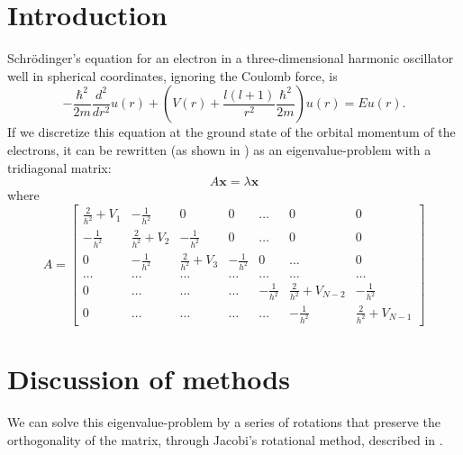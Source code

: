 \documentclass[a4paper]{article}
\begin{document}
\section{Introduction}\label{sec:intro}
Schrödinger's equation for an electron in a three-dimensional harmonic oscillator well in spherical coordinates, ignoring the Coulomb force, is
\begin{equation}
  -\frac{\hbar^2}{2 m} \frac{d^2}{dr^2} u(r)
       + \left ( V(r) + \frac{l (l + 1)}{r^2}\frac{\hbar^2}{2 m}
                                    \right ) u(r)  = E u(r) .
\end{equation}
If we discretize this equation at the ground state of the orbital momentum of the electrons, it can be rewritten (as shown in \cite{fys3150_project2}) as an eigenvalue-problem with a tridiagonal matrix:
\begin{equation*}
A\textbf{x} = \lambda \textbf{x}
\end{equation*}
where
\begin{equation}
A = \begin{bmatrix} \frac{2}{h^2}+V_1 & -\frac{1}{h^2} & 0   & 0    & \dots  &0     & 0 \\
                                -\frac{1}{h^2} & \frac{2}{h^2}+V_2 & -\frac{1}{h^2} & 0    & \dots  &0     &0 \\
                                0   & -\frac{1}{h^2} & \frac{2}{h^2}+V_3 & -\frac{1}{h^2}  &0       &\dots & 0\\
                                \dots  & \dots & \dots & \dots  &\dots      &\dots & \dots\\
                                0   & \dots & \dots & \dots  &-\frac{1}{h^2}  &\frac{2}{h^2}+V_{N-2} & -\frac{1}{h^2}\\
                                0   & \dots & \dots & \dots  &\dots       &-\frac{1}{h^2} & \frac{2}{h^2}+V_{N-1}
             \end{bmatrix}
\label{eq:A_matrix}
\end{equation}



\section{Discussion of methods}\label{sec:methods}
We can solve this eigenvalue-problem by a series of rotations that preserve the orthogonality of the matrix, through Jacobi's rotational method, described in \cite{mhj_lecture_notes}.
\end{document}
